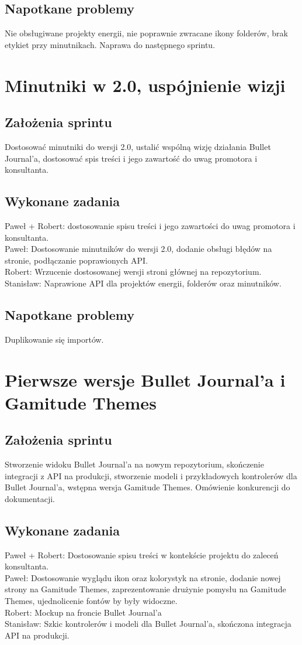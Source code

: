 \documentclass[a4paper,11pt]{report}
\begin{document}
\subsection {Napotkane problemy}
Nie obsługiwane projekty energii, nie poprawnie zwracane ikony folderów, brak etykiet przy minutnikach. Naprawa do następnego sprintu.

\section {Minutniki w 2.0, uspójnienie wizji}
\subsection {Założenia sprintu}
Dostosować minutniki do wersji 2.0, ustalić wspólną wizję działania Bullet Journal'a, dostosować spis treści i jego zawartość do uwag promotora i konsultanta.
\subsection {Wykonane zadania}
Paweł + Robert: dostosowanie spisu treści i jego zawartości do uwag promotora i konsultanta.\\
Paweł: Dostosowanie minutników do wersji 2.0, dodanie obsługi błędów na stronie, podłączanie poprawionych API.\\
Robert:  Wrzucenie dostosowanej wersji stroni głównej na repozytorium.\\
Stanisław: Naprawione API dla projektów energii, folderów oraz minutników.\\
\subsection {Napotkane problemy}
Duplikowanie się importów.

\section {Pierwsze wersje Bullet Journal'a i Gamitude Themes}
\subsection {Założenia sprintu}
Stworzenie widoku Bullet Journal'a na nowym repozytorium, skończenie integracji z API na produkcji, stworzenie modeli i przykładowych kontrolerów dla Bullet Journal'a, wstępna wersja Gamitude Themes. Omówienie konkurencji do dokumentacji.
\subsection {Wykonane zadania}
Paweł + Robert: Dostosowanie spisu treści w kontekście projektu do zaleceń konsultanta.\\
Paweł: Dostosowanie wyglądu ikon oraz kolorystyk na stronie, dodanie nowej strony na Gamitude Themes, zaprezentowanie drużynie pomysłu na Gamitude Themes, ujednolicenie fontów by były widoczne.\\
Robert: Mockup na froncie Bullet Journal'a\\
Stanisław: Szkic kontrolerów i modeli dla Bullet Journal'a, skończona integracja API na produkcji.\\
\end{document}
